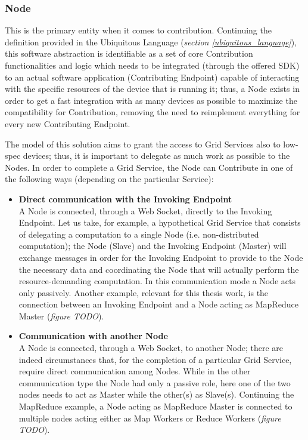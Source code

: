 \subsubsection{Node}
This is the primary entity when it comes to contribution.
Continuing the definition provided in the Ubiquitous Language (\textit{section \ref{ubiquitous_language}}), this software abstraction is identifiable as a set of core Contribution functionalities and logic which needs to be integrated (through the offered SDK) to an actual software application (Contributing Endpoint) capable of interacting with the specific resources of the device that is running it; thus, a Node exists in order to get a fast integration with as many devices as possible to maximize the compatibility for Contribution, removing the need to reimplement everything for every new Contributing Endpoint.

The model of this solution aims to grant the access to Grid Services also to low-spec devices; thus, it is important to delegate as much work as possible to the Nodes. In order to complete a Grid Service, the Node can Contribute in one of the following ways (depending on the particular Service):
\begin{itemize}
\item \textbf{Direct communication with the Invoking Endpoint}\\
A Node is connected, through a Web Socket, directly to the Invoking Endpoint. Let us take, for example, a hypothetical Grid Service that consists of delegating a computation to a single Node (i.e. non-distributed computation); the Node (Slave) and the Invoking Endpoint (Master) will exchange messages in order for the Invoking Endpoint to provide to the Node the necessary data and coordinating the Node that will actually perform the resource-demanding computation. In this communication mode a Node acts only passively.
Another example, relevant for this thesis work, is the connection between an Invoking Endpoint and a Node acting as MapReduce Master (\textit{figure TODO}).
\item \textbf{Communication with another Node}\\
A Node is connected, through a Web Socket, to another Node; there are indeed circumstances that, for the completion of a particular Grid Service, require direct communication among Nodes. While in the other communication type the Node had only a passive role, here one of the two nodes needs to act as Master while the other(s) as Slave(s). 
Continuing the MapReduce example, a Node acting as MapReduce Master is connected to multiple nodes acting either as Map Workers or Reduce Workers (\textit{figure TODO}).
\end{itemize}

